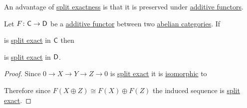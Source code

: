 \documentclass[../../main]{subfiles}
\begin{document}
An advantage of \hyperref[prop:split-exact-sequence]{split exactness} is that it is preserved under \hyperref[def:additive-functor]{additive functors}.
\begin{lemma}\label{lemma:additive-preserves-split-exact}
  Let \(F\colon \mathsf{C} \to \mathsf{D}\) be a \hyperref[def:additive-functor]{additive functor} between two \hyperref[def:abelian-category]{abelian categories}.
  If
  \begin{center}
  \end{center}
  is \hyperref[prop:split-exact-sequence]{split exact} in \(\mathsf{C}\) then
  \begin{center}
  \end{center}
  is \hyperref[prop:split-exact-sequence]{split exact} in \(\mathsf{D}\).
\end{lemma}
\begin{proof}
  Since \(0 \to X \to Y \to Z \to 0\) is \hyperref[prop:split-exact-sequence]{split exact} it is \hyperref[def:categorical-isomorphism]{isomorphic} to
  \begin{center}
  \end{center}
  Therefore since \hyperref[prop:additive-functor-characterization]{\(F(X \oplus Z) \cong F(X) \oplus F(Z)\)} the induced sequence is \hyperref[prop:split-exact-sequence]{split exact}.
\end{proof}
\end{document}
